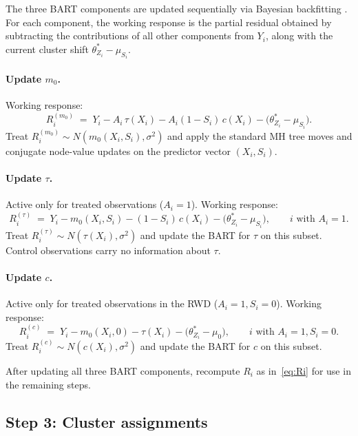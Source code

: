 \documentclass[11pt]{article}
\theoremstyle{plain}
\theoremstyle{definition}
\theoremstyle{remark}
\newcommand{\1}{\mathds{1}}
\begin{document}
The three BART components are updated sequentially via Bayesian backfitting \citep{chipman2010bart}. For each component, the working response is the partial residual obtained by subtracting the contributions of all other components from $Y_i$, along with the current cluster shift $\theta_{Z_i}^* - \mu_{S_i}$.

\paragraph{Update $m_0$.} Working response:
\begin{equation}
R_i^{(m_0)} \;=\; Y_i - A_i\, \tau(X_i) - A_i(1 - S_i)\, c(X_i) - \big(\theta_{Z_i}^* - \mu_{S_i}\big).
\end{equation}
Treat $R_i^{(m_0)} \sim N(m_0(X_i, S_i), \sigma^2)$ and apply the standard MH tree moves and conjugate node-value updates on the predictor vector $(X_i, S_i)$.

\paragraph{Update $\tau$.} Active only for treated observations ($A_i = 1$). Working response:
\begin{equation}
R_i^{(\tau)} \;=\; Y_i - m_0(X_i, S_i) - (1 - S_i)\, c(X_i) - \big(\theta_{Z_i}^* - \mu_{S_i}\big), \qquad i \text{ with } A_i = 1.
\end{equation}
Treat $R_i^{(\tau)} \sim N(\tau(X_i), \sigma^2)$ and update the BART for $\tau$ on this subset. Control observations carry no information about $\tau$.

\paragraph{Update $c$.} Active only for treated observations in the RWD ($A_i = 1, S_i = 0$). Working response:
\begin{equation}
R_i^{(c)} \;=\; Y_i - m_0(X_i, 0) - \tau(X_i) - \big(\theta_{Z_i}^* - \mu_0\big), \qquad i \text{ with } A_i = 1, S_i = 0.
\end{equation}
Treat $R_i^{(c)} \sim N(c(X_i), \sigma^2)$ and update the BART for $c$ on this subset.

After updating all three BART components, recompute $R_i$ as in~\eqref{eq:Ri} for use in the remaining steps.

\subsection{Step 3: Cluster assignments}
\end{document}
